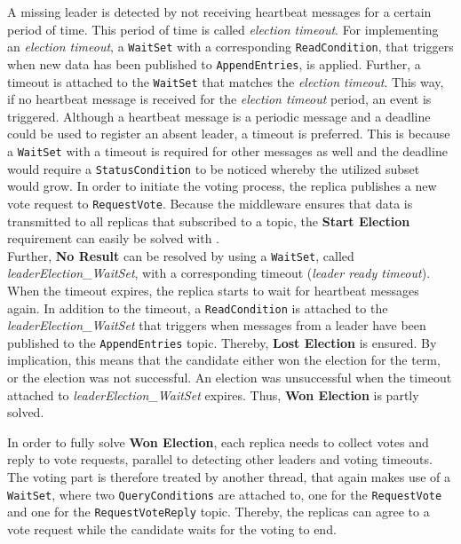 A missing leader is detected by not receiving heartbeat messages for a certain period of time.
This period of time is called \textit{election timeout}.
For implementing an \textit{election timeout}, a \texttt{WaitSet} with a corresponding \texttt{ReadCondition}, that triggers when new data has been published to \texttt{AppendEntries}, is applied.
Further, a timeout is attached to the \texttt{WaitSet} that matches the \textit{election timeout}.
This way, if no heartbeat message is received for the \textit{election timeout} period, an event is triggered.
Although a heartbeat message is a periodic message and a deadline  could be used to register an absent leader, a timeout is preferred.
This is because a \texttt{WaitSet} with a timeout is required for other messages as well and the deadline  would require a \texttt{StatusCondition} to be noticed whereby the utilized  subset would grow.
In order to initiate the voting process, the replica publishes a new vote request to \texttt{RequestVote}.
Because the middleware ensures that data is transmitted to all replicas that subscribed to a topic, the \textbf{Start Election} requirement can easily be solved with .
\\

Further, \textbf{No Result} can be resolved by using a \texttt{WaitSet}, called \textit{leaderElection\_WaitSet}, with a corresponding timeout (\textit{leader ready timeout}).
When the timeout expires, the replica starts to wait for heartbeat messages again.
In addition to the timeout, a \texttt{ReadCondition} is attached to the \textit{leaderElection\_WaitSet} that triggers when messages from a leader have been published to the \texttt{AppendEntries} topic.
Thereby, \textbf{Lost Election} is ensured.
By implication, this means that the candidate either won the election for the term, or the election was not successful.
An election was unsuccessful when the timeout attached to \textit{leaderElection\_WaitSet} expires.
Thus, \textbf{Won Election} is partly solved.

In order to fully solve \textbf{Won Election}, each replica needs to collect votes and reply to vote requests, parallel to detecting other leaders and voting timeouts.
The voting part is therefore treated by another  thread, that again makes use of a \texttt{WaitSet}, where two \texttt{QueryConditions} are attached to, one for the \texttt{RequestVote} and one for the \texttt{RequestVoteReply} topic.
Thereby, the replicas can agree to a vote request while the candidate waits for the voting to end.


